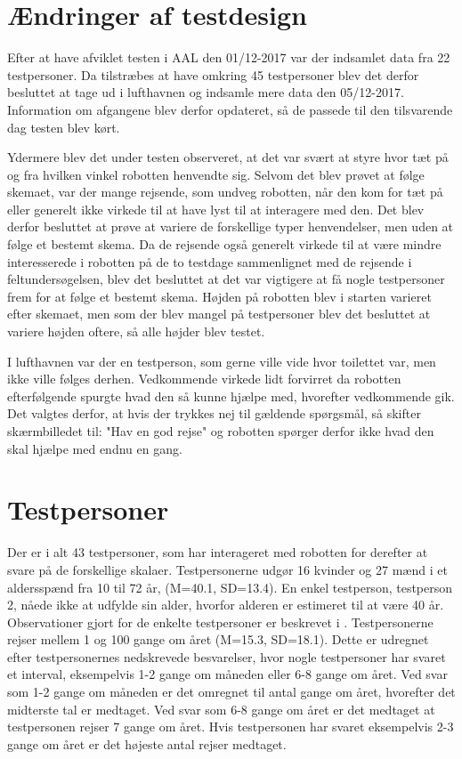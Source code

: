 \section{Ændringer af testdesign}
\label{TestAfSkalaerAendringerTD}
%
Efter at have afviklet testen i AAL den 01/12-2017 var der indsamlet data fra 22 testpersoner. Da tilstræbes at have omkring 45 testpersoner blev det derfor besluttet at tage ud i lufthavnen og indsamle mere data den 05/12-2017. Information om afgangene blev derfor opdateret, så de passede til den tilsvarende dag testen blev kørt. 

Ydermere blev det under testen observeret, at det var svært at styre hvor tæt på og fra hvilken vinkel robotten henvendte sig. Selvom det blev prøvet at følge skemaet, var der mange rejsende, som undveg robotten, når den kom for tæt på eller generelt ikke virkede til at have lyst til at interagere med den. Det blev derfor besluttet at prøve at variere de forskellige typer henvendelser, men uden at følge et bestemt skema. Da de rejsende også generelt virkede til at være mindre interesserede i robotten på de to testdage sammenlignet med de rejsende i feltundersøgelsen, blev det besluttet at det var vigtigere at få nogle testpersoner frem for at følge et bestemt skema. Højden på robotten blev i starten varieret efter skemaet, men som der blev mangel på testpersoner blev det besluttet at variere højden oftere, så alle højder blev testet.

I lufthavnen var der en testperson, som gerne ville vide hvor toilettet var, men ikke ville følges derhen. Vedkommende virkede lidt forvirret da robotten efterfølgende spurgte hvad den så kunne hjælpe med, hvorefter vedkommende gik. Det valgtes derfor, at hvis der trykkes nej til gældende spørgsmål, så skifter skærmbilledet til: "Hav en god rejse" og robotten spørger derfor ikke hvad den skal hjælpe med endnu en gang.

\section{Testpersoner}
\label{ParametreFaktiskeTestpersoner}
%
Der er i alt 43 testpersoner, som har interageret med robotten for derefter at svare på de forskellige skalaer. Testpersonerne udgør 16 kvinder og 27 mænd i et aldersspænd fra 10 til 72 år, (M=40.1, SD=13.4). En enkel testperson, testperson 2, nåede ikke at udfylde sin alder, hvorfor alderen er estimeret til at være 40 år. Observationer gjort for de enkelte testpersoner er beskrevet i . Testpersonerne rejser mellem 1 og 100 gange om året (M=15.3, SD=18.1). Dette er udregnet efter testpersonernes nedskrevede besvarelser, hvor nogle testpersoner har svaret et interval, eksempelvis 1-2 gange om måneden eller 6-8 gange om året. Ved svar som 1-2 gange om måneden er det omregnet til antal gange om året, hvorefter det midterste tal er medtaget. Ved svar som 6-8 gange om året er det medtaget at testpersonen rejser 7 gange om året. Hvis testpersonen har svaret eksempelvis 2-3 gange om året er det højeste antal rejser medtaget.